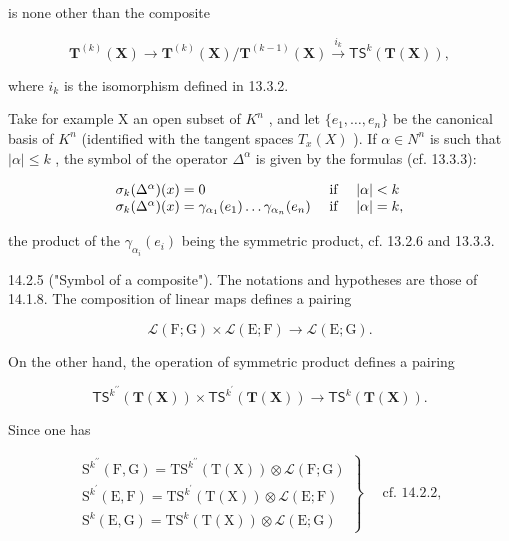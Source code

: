is none other than the composite

\[
\mathbf {T} ^ {(k)} (\mathbf {X}) \rightarrow \mathbf {T} ^ {(k)} (\mathbf {X}) / \mathbf {T} ^ {(k - 1)} (\mathbf {X}) \xrightarrow {i _ {k}} \mathsf {T S} ^ {k} (\mathbf {T} (\mathbf {X})),
\]

where \(i_{k}\) is the isomorphism defined in 13.3.2.

Take for example X an open subset of \(K^{n}\) , and let \(\{e_{1},\ldots,e_{n}\}\) be the canonical basis of \(K^{n}\) (identified with the tangent spaces \(T_{x}(X)\) ). If \(\alpha\in N^{n}\) is such that \(|\alpha|\leqslant k\) , the symbol of the operator \(\Delta^{\alpha}\) is given by the formulas (cf. 13.3.3):

\[
\begin{array}{l l} \sigma_ {k} (\Delta^ {\alpha}) (x) = 0 & \text { if } \quad | \alpha | <   k \\ \sigma_ {k} (\Delta^ {\alpha}) (x) = \gamma_ {\alpha_ {1}} (e _ {1}) \ldots \gamma_ {\alpha_ {n}} (e _ {n}) & \text { if } \quad | \alpha | = k, \end{array}
\]

the product of the \(\gamma_{\alpha_i}(e_i)\) being the symmetric product, cf. 13.2.6 and 13.3.3.

14.2.5 ("Symbol of a composite"). The notations and hypotheses are those of 14.1.8. The composition of linear maps defines a pairing

\[
\mathcal {L} (\mathrm{F}; \mathrm{G}) \times \mathcal {L} (\mathrm{E}; \mathrm{F}) \rightarrow \mathcal {L} (\mathrm{E}; \mathrm{G}).
\]

On the other hand, the operation of symmetric product defines a pairing

\[
\mathsf {T S} ^ {k ^ {\prime \prime}} (\mathbf {T} (\mathbf {X})) \times \mathsf {T S} ^ {k ^ {\prime}} (\mathbf {T} (\mathbf {X})) \rightarrow \mathsf {T S} ^ {k} (\mathbf {T} (\mathbf {X})).
\]

Since one has

\[
\left. \begin{array}{l} \mathrm{S} ^ {k ^ {\prime \prime}} (\mathrm{F}, \mathrm{G}) = \mathrm{TS} ^ {k ^ {\prime \prime}} (\mathrm{T} (\mathrm{X})) \otimes \mathscr {L} (\mathrm{F}; \mathrm{G}) \\ \mathrm{S} ^ {k ^ {\prime}} (\mathrm{E}, \mathrm{F}) = \mathrm{TS} ^ {k ^ {\prime}} (\mathrm{T} (\mathrm{X})) \otimes \mathscr {L} (\mathrm{E}; \mathrm{F}) \\ \mathrm{S} ^ {k} (\mathrm{E}, \mathrm{G}) = \mathrm{TS} ^ {k} (\mathrm{T} (\mathrm{X})) \otimes \mathscr {L} (\mathrm{E}; \mathrm{G}) \end{array} \right\} \quad \text { cf. } 1 4. 2. 2,
\]

